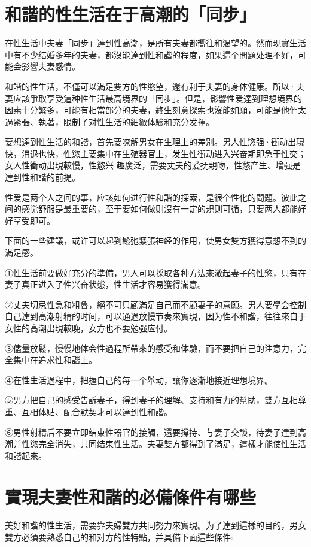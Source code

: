 \documentclass[12pt,UTF8]{ctexbook}
\begin{document}
\section{和諧的性生活在于高潮的「同步」}

在性生活中夫妻「同步」達到性高潮，是所有夫妻都嚮往和渴望的。然而現實生活中有不少结婚多年的夫妻，都沒能達到性和諧的程度，如果這个問題处理不好，可能会影響夫妻感情。

和諧的性生活，不僅可以滿足雙方的性慾望，還有利于夫妻的身体健康。所以·夫妻应該爭取享受這种性生活最高境界的「同步」。但是，影響性爱達到理想境界的因素十分繁多，可能有相當部分的夫妻，終生刻意探索也沒能如願，可能是他們太過紧張、執著，限制了对性生活的細緻体驗和充分发揮。

要想達到性生活的和諧，首先要嘹解男女在生理上的差別。男人性慾强·衝动出現快，消退也快，性慾主要集中在生殖器官上，发生性衝动进入兴奋期即急于性交；女人性衝动出現較慢，性慾兴
趣廣泛，需要丈夫的爱抚親吻，性憋产生、增强是達到性和諧的前提。

性爱是两个人之间的事，应該如何进行性和諧的探索，是很个性化的問題。彼此之间的感觉舒服是最重要的，至于要如何做则沒有一定的規则可循，只要两人都能好好享受即可。

下面的一些建議，或许可以起到鬆弛紧張神经的作用，使男女雙方獲得意想不到的滿足感。

①性生活前要做好充分的準備，男人可以採取各种方法來激起妻子的性慾，只有在妻子真正进入了性兴奋状態，性生活才容易獲得滿意。

②丈夫切忌性急和粗魯，絕不可只顧滿足自己而不顧妻子的意願。男人要學会控制自己達到高潮射精的时间，可以通過放慢节奏來實現，因为性不和諧，往往來自于女性的高潮出現較晚，女方也不要勉强应付。

③儘量放鬆，慢慢地体会性過程所帶來的感受和体驗，而不要把自己的注意力，完全集中在追求性和諧上。

④在性生活過程中，把握自己的每一个舉动，讓你逐漸地接近理想境界。

⑤男方把自己的感受告訴妻子，得到妻子的理解、支持和有力的幫助，雙方互相尊重、互相体贴、配合默契才可以達到性和諧。

⑥男性射精后不要立即结束性器官的接觸，還要撐持、与妻子交談，待妻子達到高潮并性慾完全消失，共同结束性生活。夫妻雙方都得到了滿足，這樣才能使性生活和諧起來。

\section{實現夫妻性和諧的必備條件有哪些}

美好和諧的性生活，需要靠夫婦雙方共同努力來實現。为了達到這樣的目的，男女雙方必須要熟悉自己的和对方的性特點，并具備下面這些條件:
\end{document}
